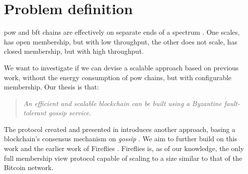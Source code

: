 \documentclass[USenglish]{uit-thesis}
\begin{document}
   

\section{Problem definition}

\gls{pow} and \gls{bft} chains are effectively on separate ends of a spectrum \cite{quest}.
One scales, has open membership, but with low throughput, the other does not scale, has closed membership, but with high throughput.

We want to investigate if we can devise a scalable approach based on previous work, without the energy consumption of \gls{pow} chains, but with configurable membership. 
Our thesis is that:
\newtheorem{statement}{Statement}
\begin{quote}
	\textit{An efficient and scalable blockchain can be built using a Byzantine fault-tolerant gossip service.}
\end{quote}

The protocol created and presented in \cite{vanblock} introduces another approach, basing a blockchain's consensus mechanism on \textit{gossip} \cite{epidemic}.
We aim to further build on this work and the earlier work of Fireflies \cite{flies, flies2}.
Fireflies is, as of our knowledge, the only full membership view protocol capable of scaling to a size similar to that of the Bitcoin network.



\end{document}
